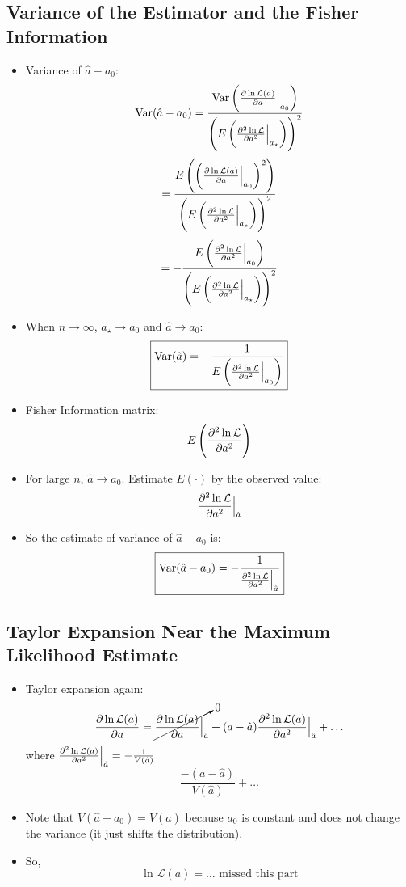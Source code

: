 \subsection{Variance of the Estimator and the Fisher Information}

\begin{itemize}
    \item Variance of $\hat{a} - a_0$:
          \[ \text{Var}(\hat{a} - a_0) = \frac{\text{Var}\left( \pdv{\ln \mathcal{L}(a)}{a} \Big|_{a_0} \right)}{\left( E\left( \pdv[2]{\ln \mathcal{L}}{a} \Big|_{a_{\star}} \right) \right)^2} \]
          \[ = \frac{E\left( \left( \pdv{\ln \mathcal{L}(a)}{a} \Big|_{a_0} \right)^2 \right)}{\left( E\left( \pdv[2]{\ln \mathcal{L}}{a} \Big|_{a_{\star}} \right) \right)^2} \]
          \[ = -\frac{E\left( \pdv[2]{\ln \mathcal{L}}{a} \Big|_{a_0} \right)}{\left( E\left( \pdv[2]{\ln \mathcal{L}}{a} \Big|_{a_{\star}} \right) \right)^2} \]
    \item When $n \to \infty$, $a_{\star} \to a_0$ and $\hat{a} \to a_0$:
          \[ \boxed{\text{Var}(\hat{a}) = -\frac{1}{E\left( \pdv[2]{\ln \mathcal{L}}{a} \Big|_{a_0} \right)} } \]
    \item Fisher Information matrix:
          \[ E\left( \pdv[2]{\ln \mathcal{L}}{a} \right) \]
    \item For large $n$, $\hat{a} \to a_0$. Estimate $E(\cdot)$ by the observed value:
          \[ \pdv[2]{\ln \mathcal{L}}{a} \Big|_{\hat{a}} \]
    \item So the estimate of variance of $\hat{a} - a_0$ is:
          \[ \boxed{\text{Var}(\hat{a}-a_0) = -\frac{1}{\pdv[2]{\ln \mathcal{L}}{a} \Big|_{\hat{a}}} } \]
\end{itemize}

\subsection{Taylor Expansion Near the Maximum Likelihood Estimate}

\begin{itemize}
    \item Taylor expansion again:
          \[ \pdv{\ln \mathcal{L}(a)}{a} = \cancelto{0}{\pdv{\ln \mathcal{L}(a)}{a} \Big|_{\hat{a}}} + (a - \hat{a}) \pdv[2]{\ln \mathcal{L}(a)}{a} \Big|_{\hat{a}} + \ldots \]
          where $\pdv[2]{\ln \mathcal{L}(a)}{a} \Big|_{\hat{a}} = -\frac{1}{V(\hat{a})}$
          \[ \frac{-(a-\hat{a})}{V(\hat{a})} + \ldots \]
    \item Note that $V(\hat{a} - a_0) = V(\hat{a})$ because $a_0$ is constant and does not change the variance (it just shifts the distribution).
    \item So,
          \[ \ln \mathcal{L}(a) = \ldots \text{ missed this part} \]
\end{itemize}

